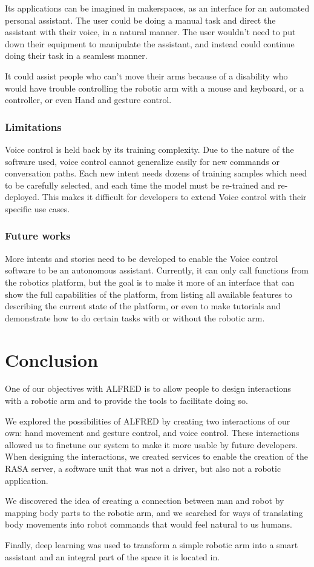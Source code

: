Its applications can be imagined in makerspaces, as an interface for an automated personal assistant. The user could be doing a manual task and direct the assistant with their voice, in a natural manner. The user wouldn't need to put down their equipment to manipulate the assistant, and instead could continue doing their task in a seamless manner.

It could assist people who can't move their arms because of a disability who would have trouble controlling the robotic arm with a mouse and keyboard, or a controller, or even Hand and gesture control.

\subsubsection{Limitations}

Voice control is held back by its training complexity. Due to the nature of the software used, voice control cannot generalize easily for new commands or conversation paths. Each new intent needs dozens of training samples which need to be carefully selected, and each time the model must be re-trained and re-deployed. This makes it difficult for developers to extend Voice control with their specific use cases.

\subsubsection{Future works}

More intents and stories need to be developed to enable the Voice control software to be an autonomous assistant. Currently, it can only call functions from the robotics platform, but the goal is to make it more of an interface that can show the full capabilities of the platform, from listing all available features to describing the current state of the platform, or even to make tutorials and demonstrate how to do certain tasks with or without the robotic arm.



\section{Conclusion}

One of our objectives with ALFRED is to allow people to design interactions with a robotic arm and to provide the tools to facilitate doing so.

We explored the possibilities of ALFRED by creating two interactions of our own: hand movement and gesture control, and voice control. These interactions allowed us to finetune our system to make it more usable by future developers. When designing the interactions, we created services to enable the creation of the RASA server, a software unit that was not a driver, but also not a robotic application.

We discovered the idea of creating a connection between man and robot by mapping body parts to the robotic arm, and we searched for ways of translating body movements into robot commands that would feel natural to us humans.

Finally, deep learning was used to transform a simple robotic arm into a smart assistant and an integral part of the space it is located in.
